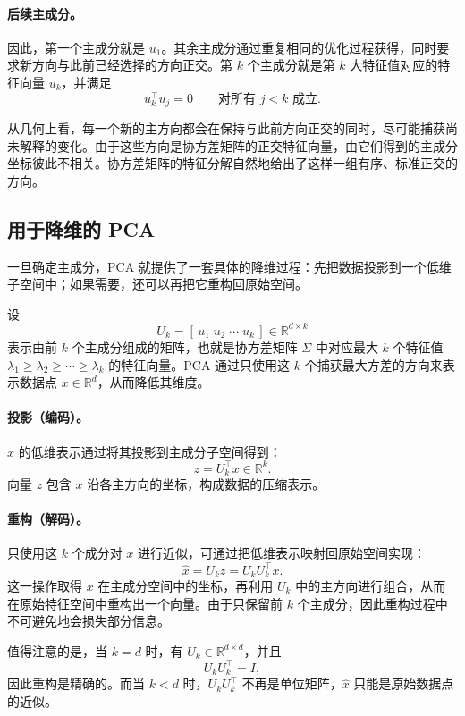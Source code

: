 \paragraph{后续主成分。}
因此，第一个主成分就是 \(u_1\)。其余主成分通过重复相同的优化过程获得，同时要求新方向与此前已经选择的方向正交。第 \(k\) 个主成分就是第 \(k\) 大特征值对应的特征向量 \(u_k\)，并满足
\[
u_k^\top u_j = 0 \qquad \text{对所有 } j < k \text{ 成立}.
\]

从几何上看，每一个新的主方向都会在保持与此前方向正交的同时，尽可能捕获尚未解释的变化。由于这些方向是协方差矩阵的正交特征向量，由它们得到的主成分坐标彼此不相关。协方差矩阵的特征分解自然地给出了这样一组有序、标准正交的方向。

\subsection{用于降维的 PCA}

一旦确定主成分，PCA 就提供了一套具体的降维过程：先把数据投影到一个低维子空间中；如果需要，还可以再把它重构回原始空间。

设
\[
U_k = [\,u_1\;u_2\;\cdots\;u_k\,] \in \mathbb{R}^{d \times k}
\]
表示由前 \(k\) 个主成分组成的矩阵，也就是协方差矩阵 \(\Sigma\) 中对应最大 \(k\) 个特征值 \(\lambda_1 \ge \lambda_2 \ge \cdots \ge \lambda_k\) 的特征向量。PCA 通过只使用这 \(k\) 个捕获最大方差的方向来表示数据点 \(x \in \mathbb{R}^d\)，从而降低其维度。

\paragraph{投影（编码）。}
\(x\) 的低维表示通过将其投影到主成分子空间得到：
\[
z = U_k^\top x \in \mathbb{R}^k.
\]
向量 \(z\) 包含 \(x\) 沿各主方向的坐标，构成数据的压缩表示。

\paragraph{重构（解码）。}
只使用这 \(k\) 个成分对 \(x\) 进行近似，可通过把低维表示映射回原始空间实现：
\[
\hat{x} = U_k z = U_k U_k^\top x.
\]
这一操作取得 \(x\) 在主成分空间中的坐标，再利用 \(U_k\) 中的主方向进行组合，从而在原始特征空间中重构出一个向量。由于只保留前 \(k\) 个主成分，因此重构过程中不可避免地会损失部分信息。

值得注意的是，当 \(k=d\) 时，有 \(U_k \in \mathbb{R}^{d\times d}\)，并且
\[
U_k U_k^\top = I,
\]
因此重构是精确的。而当 \(k<d\) 时，\(U_k U_k^\top\) 不再是单位矩阵，\(\hat{x}\) 只能是原始数据点的近似。

